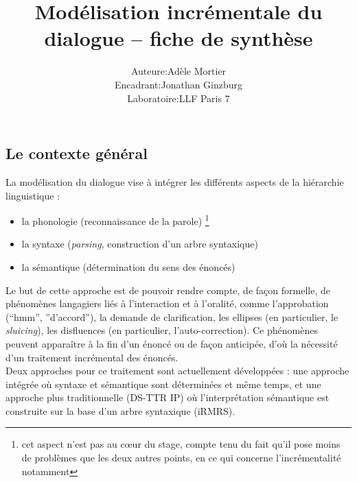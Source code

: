 \documentclass[11pt]{article}
\begin{document}
	\title{Modélisation incrémentale du dialogue -- fiche de synthèse}
	\author{\begin{tabular}{rcl}
			Auteure &:& Adèle Mortier \\
			Encadrant &:& Jonathan Ginzburg\\
			Laboratoire &:& LLF Paris 7
		\end{tabular}
	}
	\maketitle

	\subsection*{Le contexte général}\label{contexte}
	La modélisation du dialogue vise à intégrer les différents aspects de la hiérarchie linguistique :
	\begin{itemize}
		\item la phonologie (reconnaissance de la parole) \footnote{cet aspect n'est pas au cœur du stage, compte tenu du fait qu'il pose moins de problèmes que les deux autres points, en ce qui concerne l'incrémentalité notamment}
		\item la syntaxe (\textit{parsing}, construction d'un arbre syntaxique)
		\item la sémantique (détermination du sens des énoncés)
	\end{itemize}
	Le but de cette approche est de pouvoir rendre compte, de façon formelle, de phénomènes langagiers liés à l'interaction et à l'oralité, comme l'approbation (``hmm'', ''d'accord''), la demande de clarification, les ellipses (en particulier, le \textit{sluicing}), les disfluences (en particulier, l'auto-correction). Ce phénomènes peuvent apparaître à la fin d'un énoncé ou de façon anticipée, d'où la nécessité d'un traitement incrémental des énoncés.\\
	Deux approches pour ce traitement sont actuellement développées : une approche intégrée où syntaxe et sémantique sont déterminées et même temps, et une approche plus traditionnelle (DS-TTR IP) où l'interprétation sémantique est construite sur la base d'un arbre syntaxique (iRMRS).
	
	
\end{document}
